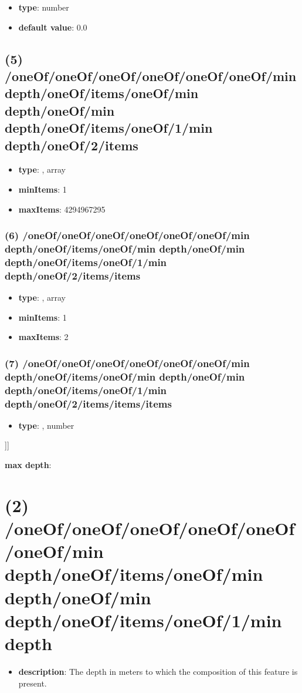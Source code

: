 \begin{itemize}[leftmargin=6em]\item {\bf type}: number\item {\bf default value}: 0.0
\end{itemize}\subsection{(5) /oneOf/oneOf/oneOf/oneOf/oneOf/oneOf/min depth/oneOf/items/oneOf/min depth/oneOf/min depth/oneOf/items/oneOf/1/min depth/oneOf/2/items}
\begin{itemize}[leftmargin=5em]\item {\bf type}: , array\item {\bf minItems}: 1
\item {\bf maxItems}: 4294967295
\end{itemize}\subsubsection{(6) /oneOf/oneOf/oneOf/oneOf/oneOf/oneOf/min depth/oneOf/items/oneOf/min depth/oneOf/min depth/oneOf/items/oneOf/1/min depth/oneOf/2/items/items}
\begin{itemize}[leftmargin=6em]\item {\bf type}: , array\item {\bf minItems}: 1
\item {\bf maxItems}: 2
\end{itemize}\subsubsection{(7) /oneOf/oneOf/oneOf/oneOf/oneOf/oneOf/min depth/oneOf/items/oneOf/min depth/oneOf/min depth/oneOf/items/oneOf/1/min depth/oneOf/2/items/items/items}
\begin{itemize}[leftmargin=7em]\item {\bf type}: , number\end{itemize}]]\item {\bf max depth}: \section{(2) /oneOf/oneOf/oneOf/oneOf/oneOf/oneOf/min depth/oneOf/items/oneOf/min depth/oneOf/min depth/oneOf/items/oneOf/1/min depth}
\begin{itemize}[leftmargin=2em]\item {\bf description}: The depth in meters to which the composition of this feature is present.
\end{itemize}
